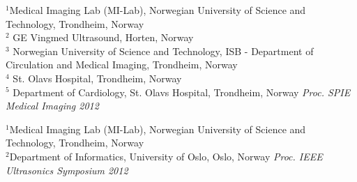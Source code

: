 \documentclass[10pt,b5paper,twoside]{book}
\begin{document}
\begin{bibunit}[ieeetr]
{
$^{1}$Medical Imaging Lab (MI-Lab), Norwegian University of Science and Technology, Trondheim, Norway\\
$^{2}$ GE Vingmed Ultrasound, Horten, Norway\\
$^{3}$ Norwegian University of Science and Technology, ISB - Department of Circulation and Medical Imaging, Trondheim, Norway\\
$^{4}$ St. Olavs Hospital, Trondheim, Norway\\
$^{5}$ Department of Cardiology, St. Olavs Hospital, Trondheim, Norway
}
\noindent \textit{Proc. SPIE Medical Imaging 2012}
%
\newpage{}
\putbib[bibSPTD]
\end{bibunit}

\begin{bibunit}[ieeetr]
{
	$^{1}$Medical Imaging Lab (MI-Lab), Norwegian University of Science and Technology, Trondheim, Norway\\
    	$^{2}$Department of Informatics, University of Oslo, Oslo, Norway
}
\noindent \textit{Proc. IEEE Ultrasonics Symposium 2012}
%
\newpage{}
\putbib[bibSPTD]
\end{bibunit}

\appendix
\end{document}
